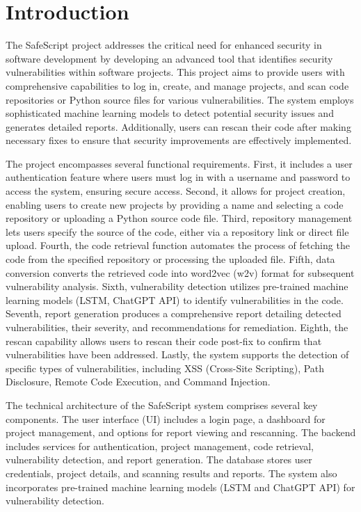 \chapter{Introduction}\label{chap:introduction}

The SafeScript project addresses the critical need for enhanced security in software development by developing an advanced tool that identifies security vulnerabilities within software projects. 
This project aims to provide users with comprehensive capabilities to log in, create, and manage projects, and scan code repositories or Python source files for various vulnerabilities. 
The system employs sophisticated machine learning models to detect potential security issues and generates detailed reports. 
Additionally, users can rescan their code after making necessary fixes to ensure that security improvements are effectively implemented.

The project encompasses several functional requirements. 
First, it includes a user authentication feature where users must log in with a username and password to access the system, ensuring secure access. 
Second, it allows for project creation, enabling users to create new projects by providing a name and selecting a code repository or uploading a Python source code file. 
Third, repository management lets users specify the source of the code, either via a repository link or direct file upload. 
Fourth, the code retrieval function automates the process of fetching the code from the specified repository or processing the uploaded file. 
Fifth, data conversion converts the retrieved code into word2vec (w2v) format for subsequent vulnerability analysis. 
Sixth, vulnerability detection utilizes pre-trained machine learning models (LSTM, ChatGPT API) to identify vulnerabilities in the code. 
Seventh, report generation produces a comprehensive report detailing detected vulnerabilities, their severity, and recommendations for remediation. 
Eighth, the rescan capability allows users to rescan their code post-fix to confirm that vulnerabilities have been addressed. 
Lastly, the system supports the detection of specific types of vulnerabilities, including XSS (Cross-Site Scripting), Path Disclosure, Remote Code Execution, and Command Injection.

The technical architecture of the SafeScript system comprises several key components. 
The user interface (UI) includes a login page, a dashboard for project management, and options for report viewing and rescanning. 
The backend includes services for authentication, project management, code retrieval, vulnerability detection, and report generation. 
The database stores user credentials, project details, and scanning results and reports. 
The system also incorporates pre-trained machine learning models (LSTM and ChatGPT API) for vulnerability detection.

